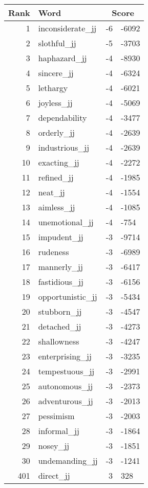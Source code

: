\begin{longtable}[!htbp]{| rlr@{.}l |}
    \hline
    \textbf{Rank} & \textbf{Word} & \multicolumn{2}{c|}{\textbf{Score}} \\
    \hline
    \endhead
    1 & inconsiderate\_jj & -6 & -6092 \\
    2 & slothful\_jj & -5 & -3703 \\
    3 & haphazard\_jj & -4 & -8930 \\
    4 & sincere\_jj & -4 & -6324 \\
    5 & lethargy & -4 & -6021 \\
    6 & joyless\_jj & -4 & -5069 \\
    7 & dependability & -4 & -3477 \\
    8 & orderly\_jj & -4 & -2639 \\
    9 & industrious\_jj & -4 & -2639 \\
    10 & exacting\_jj & -4 & -2272 \\
    11 & refined\_jj & -4 & -1985 \\
    12 & neat\_jj & -4 & -1554 \\
    13 & aimless\_jj & -4 & -1085 \\
    14 & unemotional\_jj & -4 & -754 \\
    15 & impudent\_jj & -3 & -9714 \\
    16 & rudeness & -3 & -6989 \\
    17 & mannerly\_jj & -3 & -6417 \\
    18 & fastidious\_jj & -3 & -6156 \\
    19 & opportunistic\_jj & -3 & -5434 \\
    20 & stubborn\_jj & -3 & -4547 \\
    21 & detached\_jj & -3 & -4273 \\
    22 & shallowness & -3 & -4247 \\
    23 & enterprising\_jj & -3 & -3235 \\
    24 & tempestuous\_jj & -3 & -2991 \\
    25 & autonomous\_jj & -3 & -2373 \\
    26 & adventurous\_jj & -3 & -2013 \\
    27 & pessimism & -3 & -2003 \\
    28 & informal\_jj & -3 & -1864 \\
    29 & nosey\_jj & -3 & -1851 \\
    30 & undemanding\_jj & -3 & -1241 \\
    401 & direct\_jj & 3 & 328 \\

\end{longtable}
